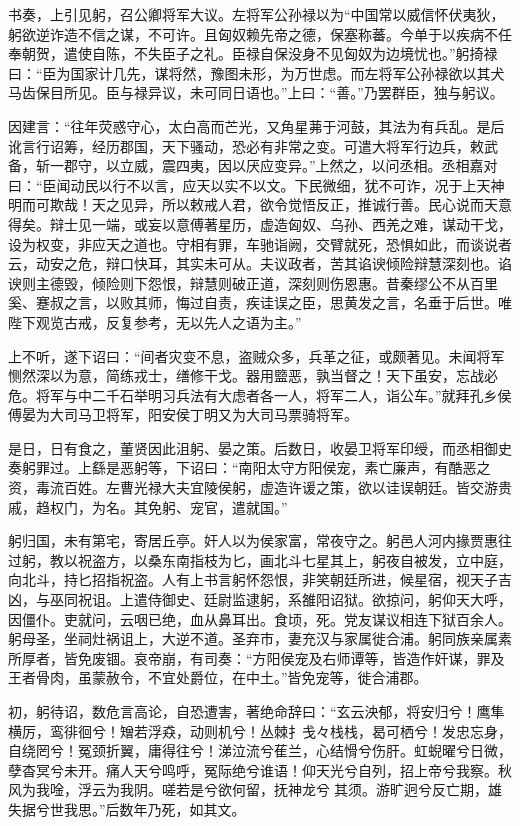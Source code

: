 \documentclass[]{article}
\begin{document}
书奏，上引见躬，召公卿将军大议。左将军公孙禄以为``中国常以威信怀伏夷狄，躬欲逆诈造不信之谋，不可许。且匈奴赖先帝之德，保塞称蕃。今单于以疾病不任奉朝贺，遣使自陈，不失臣子之礼。臣禄自保没身不见匈奴为边境忧也。''躬掎禄曰：``臣为国家计几先，谋将然，豫图未形，为万世虑。而左将军公孙禄欲以其犬马齿保目所见。臣与禄异议，未可同日语也。''上曰：``善。''乃罢群臣，独与躬议。

因建言：``往年荧惑守心，太白高而芒光，又角星茀于河鼓，其法为有兵乱。是后讹言行诏筹，经历郡国，天下骚动，恐必有非常之变。可遣大将军行边兵，敕武备，斩一郡守，以立威，震四夷，因以厌应变异。''上然之，以问丞相。丞相嘉对曰：``臣闻动民以行不以言，应天以实不以文。下民微细，犹不可诈，况于上天神明而可欺哉！天之见异，所以敕戒人君，欲令觉悟反正，推诚行善。民心说而天意得矣。辩士见一端，或妄以意傅著星历，虚造匈奴、乌孙、西羌之难，谋动干戈，设为权变，非应天之道也。守相有罪，车驰诣阙，交臂就死，恐惧如此，而谈说者云，动安之危，辩口快耳，其实未可从。夫议政者，苦其谄谀倾险辩慧深刻也。谄谀则主德毁，倾险则下怨恨，辩慧则破正道，深刻则伤恩惠。昔秦缪公不从百里奚、蹇叔之言，以败其师，悔过自责，疾诖误之臣，思黄发之言，名垂于后世。唯陛下观览古戒，反复参考，无以先人之语为主。''

上不听，遂下诏曰：``间者灾变不息，盗贼众多，兵革之征，或颇著见。未闻将军恻然深以为意，简练戎士，缮修干戈。器用盬恶，孰当督之！天下虽安，忘战必危。将军与中二千石举明习兵法有大虑者各一人，将军二人，诣公车。''就拜孔乡侯傅晏为大司马卫将军，阳安侯丁明又为大司马票骑将军。

是日，日有食之，董贤因此沮躬、晏之策。后数日，收晏卫将军印绶，而丞相御史奏躬罪过。上繇是恶躬等，下诏曰：``南阳太守方阳侯宠，素亡廉声，有酷恶之资，毒流百姓。左曹光禄大夫宜陵侯躬，虚造许谖之策，欲以诖误朝廷。皆交游贵戚，趋权门，为名。其免躬、宠官，遣就国。''

躬归国，未有第宅，寄居丘亭。奸人以为侯家富，常夜守之。躬邑人河内掾贾惠往过躬，教以祝盗方，以桑东南指枝为匕，画北斗七星其上，躬夜自被发，立中庭，向北斗，持匕招指祝盗。人有上书言躬怀怨恨，非笑朝廷所进，候星宿，视天子吉凶，与巫同祝诅。上遣侍御史、廷尉监逮躬，系雒阳诏狱。欲掠问，躬仰天大呼，因僵仆。吏就问，云咽已绝，血从鼻耳出。食顷，死。党友谋议相连下狱百余人。躬母圣，坐祠灶祸诅上，大逆不道。圣弃市，妻充汉与家属徙合浦。躬同族亲属素所厚者，皆免废锢。哀帝崩，有司奏：``方阳侯宠及右师谭等，皆造作奸谋，罪及王者骨肉，虽蒙赦令，不宜处爵位，在中土。''皆免宠等，徙合浦郡。

初，躬待诏，数危言高论，自恐遭害，著绝命辞曰：``玄云泱郁，将安归兮！鹰隼横厉，鸾徘徊兮！矰若浮猋，动则机兮！丛棘扌戋々栈栈，曷可栖兮！发忠忘身，自绕罔兮！冤颈折翼，庸得往兮！涕泣流兮萑兰，心结愲兮伤肝。虹蜺曜兮日微，孽杳冥兮未开。痛人天兮鸣呼，冤际绝兮谁语！仰天光兮自列，招上帝兮我察。秋风为我唫，浮云为我阴。嗟若是兮欲何留，抚神龙兮其须。游旷迥兮反亡期，雄失据兮世我思。''后数年乃死，如其文。
\end{document}
